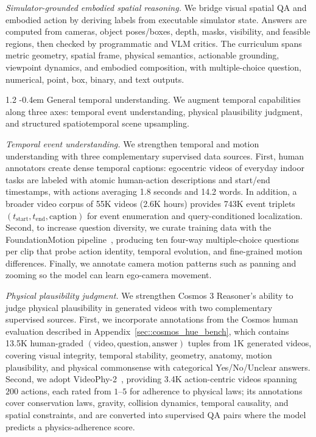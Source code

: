 \documentclass{llmxive}
\makeatletter
\providecommand{\paragraph}{  \@startsection{paragraph}{4}{\z@}    {1\baselineskip \@plus .2\baselineskip}    {-0.4em}    {\normalfont\normalsize\bfseries}}
\makeatother
\begin{document}
\textit{Simulator-grounded embodied spatial reasoning.} We bridge visual spatial QA and embodied action by deriving labels from executable simulator state. 
Answers are computed from cameras, object poses/boxes, depth, masks, visibility, and feasible regions, then checked by programmatic and VLM critics. The curriculum spans metric geometry, spatial frame, physical semantics, actionable grounding, viewpoint dynamics, and embodied composition, with multiple-choice question, numerical, point, box, binary, and text outputs.

\paragraph{General temporal understanding.}
We augment temporal capabilities along three axes: temporal event understanding, physical plausibility judgment, and structured spatiotemporal scene upsampling.

\textit{Temporal event understanding.}
We strengthen temporal and motion understanding with three complementary supervised data sources. First, human annotators create dense temporal captions: egocentric videos of everyday indoor tasks are labeled with atomic human-action descriptions and start/end timestamps, with actions averaging 1.8 seconds and 14.2 words. In addition, a broader video corpus of 55K videos (2.6K hours) provides 743K event triplets $(t_{\text{start}}, t_{\text{end}}, \text{caption})$ for event enumeration and query-conditioned localization. Second, to increase question diversity, we curate training data with the FoundationMotion pipeline~\citep{gan2025foundationmotion}, producing ten four-way multiple-choice questions per clip that probe action identity, temporal evolution, and fine-grained motion differences. Finally, we annotate camera motion patterns such as panning and zooming so the model can learn ego-camera movement.

\textit{Physical plausibility judgment.}
We strengthen Cosmos 3 Reasoner's ability to judge physical plausibility in generated videos with two complementary supervised sources. 
First, we incorporate annotations from the Cosmos human evaluation described in Appendix~\ref{sec::cosmos_hue_bench}, which contains 13.5K human-graded $(\text{video}, \text{question}, \text{answer})$ tuples from 1K generated videos, covering visual integrity, temporal stability, geometry, anatomy, motion plausibility, and physical commonsense with categorical Yes/No/Unclear answers. Second, we adopt VideoPhy-2~\citep{bansal2025videophy}, providing 3.4K action-centric videos spanning $200$ actions, each rated from $1$--$5$ for adherence to physical laws; its annotations cover conservation laws, gravity, collision dynamics, temporal causality, and spatial constraints, and are converted into supervised QA pairs where the model predicts a physics-adherence score. 
\end{document}
